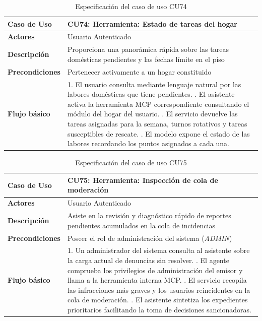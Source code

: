 \begin{table}[H]
\centering
\begin{tabular}{|p{3.2cm}|p{11.3cm}|}
\hline
\textbf{Caso de Uso} & \textbf{CU74: Herramienta: Estado de tareas del hogar} \\ \hline
\textbf{Actores} & Usuario Autenticado \\ \hline
\textbf{Descripción} & Proporciona una panorámica rápida sobre las tareas domésticas pendientes y las fechas límite en el piso \\ \hline
\textbf{Precondiciones} & Pertenecer activamente a un hogar constituido \\ \hline
\textbf{Flujo básico} & 
1. El usuario consulta mediante lenguaje natural por las labores domésticas que tiene pendientes. \newline
2. El asistente activa la herramienta MCP correspondiente consultando el módulo del hogar del usuario. \newline
3. El servicio devuelve las tareas asignadas para la semana, turnos rotativos y tareas susceptibles de rescate. \newline
4. El modelo expone el estado de las labores recordando los puntos asignados a cada una. \\ \hline
\end{tabular}
\caption{Especificación del caso de uso CU74}
\label{tab:cu74}
\end{table}

\begin{table}[H]
\centering
\begin{tabular}{|p{3.2cm}|p{11.3cm}|}
\hline
\textbf{Caso de Uso} & \textbf{CU75: Herramienta: Inspección de cola de moderación} \\ \hline
\textbf{Actores} & Usuario Autenticado \\ \hline
\textbf{Descripción} & Asiste en la revisión y diagnóstico rápido de reportes pendientes acumulados en la cola de incidencias \\ \hline
\textbf{Precondiciones} & Poseer el rol de administración del sistema (\emph{ADMIN}) \\ \hline
\textbf{Flujo básico} & 
1. Un administrador del sistema consulta al asistente sobre la carga actual de denuncias sin resolver. \newline
2. El agente comprueba los privilegios de administración del emisor y llama a la herramienta interna MCP. \newline
3. El servicio recopila las infracciones más graves y los usuarios reincidentes en la cola de moderación. \newline
4. El asistente sintetiza los expedientes prioritarios facilitando la toma de decisiones sancionadoras. \\ \hline
\end{tabular}
\caption{Especificación del caso de uso CU75}
\label{tab:cu75}
\end{table}
